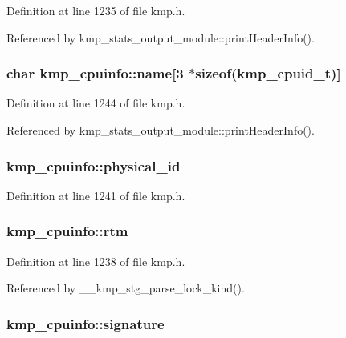 Definition at line 1235 of file kmp.\-h.



Referenced by kmp\-\_\-stats\-\_\-output\-\_\-module\-::print\-Header\-Info().

\hypertarget{structkmp__cpuinfo_a17f3ff5dbc72594ab37b92b7ee82b218}{
\subsubsection[{name}]{\setlength{\rightskip}{0pt plus 5cm}char kmp\-\_\-cpuinfo\-::name\mbox{[}3 $\ast$sizeof(kmp\-\_\-cpuid\-\_\-t)\mbox{]}}}\label{structkmp__cpuinfo_a17f3ff5dbc72594ab37b92b7ee82b218}


Definition at line 1244 of file kmp.\-h.



Referenced by kmp\-\_\-stats\-\_\-output\-\_\-module\-::print\-Header\-Info().

\hypertarget{structkmp__cpuinfo_a20bc3bb9a899855733dd05d7ba5f042c}{
\subsubsection[{physical\-\_\-id}]{ kmp\-\_\-cpuinfo\-::physical\-\_\-id}}\label{structkmp__cpuinfo_a20bc3bb9a899855733dd05d7ba5f042c}


Definition at line 1241 of file kmp.\-h.

\hypertarget{structkmp__cpuinfo_a86197ba559ddb32df419fe8589b25200}{
\subsubsection[{rtm}]{ kmp\-\_\-cpuinfo\-::rtm}}\label{structkmp__cpuinfo_a86197ba559ddb32df419fe8589b25200}


Definition at line 1238 of file kmp.\-h.



Referenced by \-\_\-\-\_\-kmp\-\_\-stg\-\_\-parse\-\_\-lock\-\_\-kind().

\hypertarget{structkmp__cpuinfo_a8aac4a116cdfd108b60d8fc8a3cda7c1}{
\subsubsection[{signature}]{ kmp\-\_\-cpuinfo\-::signature}}\label{structkmp__cpuinfo_a8aac4a116cdfd108b60d8fc8a3cda7c1}


